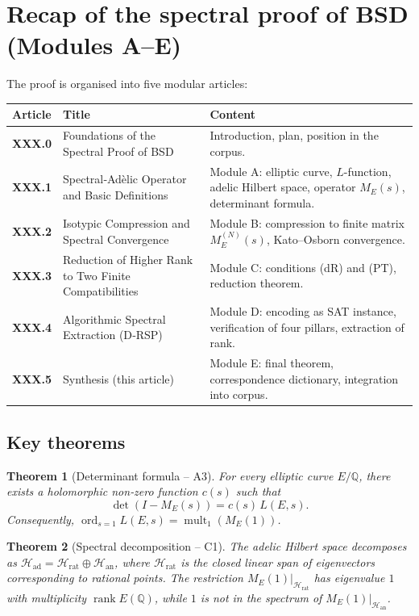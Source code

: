 \documentclass[11pt,a4paper]{article}
\newtheorem{theorem}{Theorem}[section]
\begin{document}
\section{Recap of the spectral proof of BSD (Modules A–E)}

The proof is organised into five modular articles:

\begin{center}
\small
\begin{tabular}{@{}>{\bfseries}l>{\raggedright\arraybackslash}p{4.5cm}>{\raggedright\arraybackslash}p{6cm}@{}}
\toprule
\textbf{Article} & \textbf{Title} & \textbf{Content} \\
\midrule
XXX.0 & Foundations of the Spectral Proof of BSD & Introduction, plan, position in the corpus. \\
XXX.1 & Spectral‑Adèlic Operator and Basic Definitions & Module A: elliptic curve, \(L\)-function, adelic Hilbert space, operator \(M_E(s)\), determinant formula. \\
XXX.2 & Isotypic Compression and Spectral Convergence & Module B: compression to finite matrix \(M_E^{(N)}(s)\), Kato–Osborn convergence. \\
XXX.3 & Reduction of Higher Rank to Two Finite Compatibilities & Module C: conditions (dR) and (PT), reduction theorem. \\
XXX.4 & Algorithmic Spectral Extraction (D‑RSP) & Module D: encoding as SAT instance, verification of four pillars, extraction of rank. \\
XXX.5 & Synthesis (this article) & Module E: final theorem, correspondence dictionary, integration into corpus. \\
\bottomrule
\end{tabular}
\end{center}

\subsection{Key theorems}

\begin{theorem}[Determinant formula – A3]
For every elliptic curve \(E/\mathbb{Q}\), there exists a holomorphic non‑zero function \(c(s)\) such that
\[
\det(I - M_E(s)) = c(s) \, L(E,s).
\]
Consequently, \(\operatorname{ord}_{s=1} L(E,s) = \operatorname{mult}_1(M_E(1))\).
\end{theorem}

\begin{theorem}[Spectral decomposition – C1]
The adelic Hilbert space decomposes as \(\mathcal{H}_{\text{ad}} = \mathcal{H}_{\text{rat}} \oplus \mathcal{H}_{\text{an}}\), where \(\mathcal{H}_{\text{rat}}\) is the closed linear span of eigenvectors corresponding to rational points. The restriction \(M_E(1)|_{\mathcal{H}_{\text{rat}}}\) has eigenvalue \(1\) with multiplicity \(\operatorname{rank} E(\mathbb{Q})\), while \(1\) is not in the spectrum of \(M_E(1)|_{\mathcal{H}_{\text{an}}}\).
\end{theorem}
\end{document}
